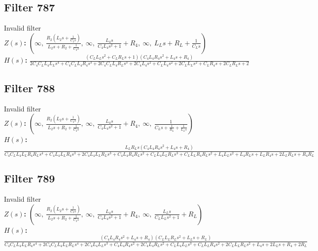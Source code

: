 \documentclass{article}
\begin{document}
\subsection*{Filter 787}
Invalid filter \\ 
\textbf{$Z(s)$:} $\left( \infty, \  \frac{R_{2} \left(L_{2} s + \frac{1}{C_{2} s}\right)}{L_{2} s + R_{2} + \frac{1}{C_{2} s}}, \  \infty, \  \frac{L_{4} s}{C_{4} L_{4} s^{2} + 1} + R_{4}, \  \infty, \  L_{L} s + R_{L} + \frac{1}{C_{L} s}\right)$ \\ 
\textbf{$H(s)$:} $\frac{\left(C_{L} L_{L} s^{2} + C_{L} R_{L} s + 1\right) \left(C_{4} L_{4} R_{4} s^{2} + L_{4} s + R_{4}\right)}{2 C_{4} C_{L} L_{4} L_{L} s^{4} + C_{4} C_{L} L_{4} R_{4} s^{3} + 2 C_{4} C_{L} L_{4} R_{L} s^{3} + 2 C_{4} L_{4} s^{2} + C_{L} L_{4} s^{2} + 2 C_{L} L_{L} s^{2} + C_{L} R_{4} s + 2 C_{L} R_{L} s + 2}$ \\ 
\subsection*{Filter 788}
Invalid filter \\ 
\textbf{$Z(s)$:} $\left( \infty, \  \frac{R_{2} \left(L_{2} s + \frac{1}{C_{2} s}\right)}{L_{2} s + R_{2} + \frac{1}{C_{2} s}}, \  \infty, \  \frac{L_{4} s}{C_{4} L_{4} s^{2} + 1} + R_{4}, \  \infty, \  \frac{1}{C_{L} s + \frac{1}{R_{L}} + \frac{1}{L_{L} s}}\right)$ \\ 
\textbf{$H(s)$:} $\frac{L_{L} R_{L} s \left(C_{4} L_{4} R_{4} s^{2} + L_{4} s + R_{4}\right)}{C_{4} C_{L} L_{4} L_{L} R_{4} R_{L} s^{4} + C_{4} L_{4} L_{L} R_{4} s^{3} + 2 C_{4} L_{4} L_{L} R_{L} s^{3} + C_{4} L_{4} R_{4} R_{L} s^{2} + C_{L} L_{4} L_{L} R_{L} s^{3} + C_{L} L_{L} R_{4} R_{L} s^{2} + L_{4} L_{L} s^{2} + L_{4} R_{L} s + L_{L} R_{4} s + 2 L_{L} R_{L} s + R_{4} R_{L}}$ \\ 
\subsection*{Filter 789}
Invalid filter \\ 
\textbf{$Z(s)$:} $\left( \infty, \  \frac{R_{2} \left(L_{2} s + \frac{1}{C_{2} s}\right)}{L_{2} s + R_{2} + \frac{1}{C_{2} s}}, \  \infty, \  \frac{L_{4} s}{C_{4} L_{4} s^{2} + 1} + R_{4}, \  \infty, \  \frac{L_{L} s}{C_{L} L_{L} s^{2} + 1} + R_{L}\right)$ \\ 
\textbf{$H(s)$:} $\frac{\left(C_{4} L_{4} R_{4} s^{2} + L_{4} s + R_{4}\right) \left(C_{L} L_{L} R_{L} s^{2} + L_{L} s + R_{L}\right)}{C_{4} C_{L} L_{4} L_{L} R_{4} s^{4} + 2 C_{4} C_{L} L_{4} L_{L} R_{L} s^{4} + 2 C_{4} L_{4} L_{L} s^{3} + C_{4} L_{4} R_{4} s^{2} + 2 C_{4} L_{4} R_{L} s^{2} + C_{L} L_{4} L_{L} s^{3} + C_{L} L_{L} R_{4} s^{2} + 2 C_{L} L_{L} R_{L} s^{2} + L_{4} s + 2 L_{L} s + R_{4} + 2 R_{L}}$ \\ 
\end{document}
